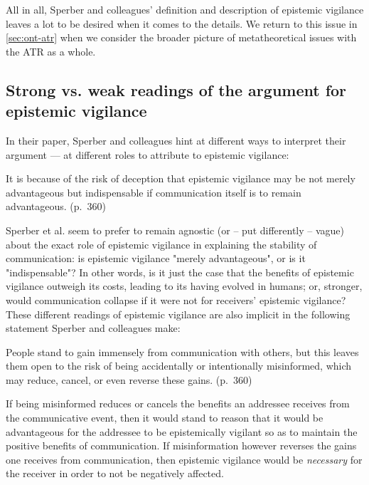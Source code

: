 All in all, Sperber and colleagues' definition and description of epistemic vigilance leaves a lot to be desired when it comes to the details. We return to this issue in \cref{sec:ont-atr} when we consider the broader picture of metatheoretical issues with the ATR as a whole.

\subsection{Strong vs. weak readings of the argument for epistemic vigilance}

In their \citeyear{Sperber10} paper, Sperber and colleagues hint at different ways to interpret their argument --- at different roles to attribute to epistemic vigilance:

\begin{quoting}
    It is because of the risk of deception that epistemic vigilance may be not merely advantageous but indispensable if communication itself is to remain advantageous.
\hfill (p.~360)
\end{quoting}
Sperber et al. seem to prefer to remain agnostic (or -- put differently -- vague) about the exact role of epistemic vigilance in explaining the stability of communication: is epistemic vigilance "merely advantageous", or is it "indispensable"? In other words, is it just the case that the benefits of epistemic vigilance outweigh its costs, leading to its having evolved in humans; or, stronger, would communication collapse if it were not for receivers' epistemic vigilance?
These different readings of epistemic vigilance are also implicit in the following statement Sperber and colleagues make:
\begin{quoting}
    People stand to gain immensely from communication with others, but this leaves them open to the risk of being accidentally or intentionally misinformed, which may reduce, cancel, or even reverse these gains.
\hfill (p.~360)
\end{quoting}
If being misinformed reduces or cancels the benefits an addressee receives from the communicative event, then it would stand to reason that it would be advantageous for the addressee to be epistemically vigilant so as to maintain the positive benefits of communication. If misinformation however reverses the gains one receives from communication, then epistemic vigilance would be \emph{necessary} for the receiver in order to not be negatively affected.


